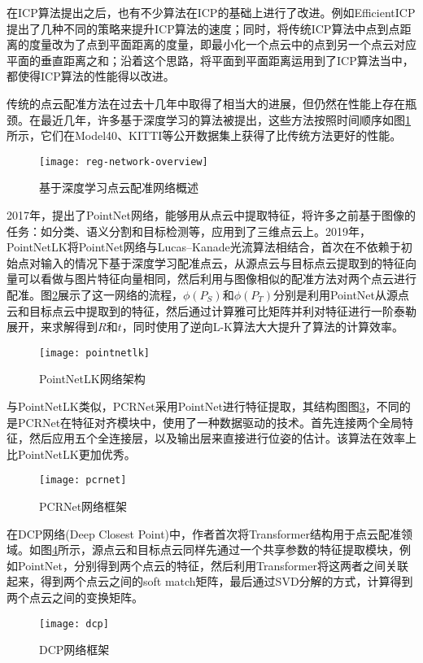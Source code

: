 在ICP算法提出之后，也有不少算法在ICP的基础上进行了改进。例如EfficientICP\cite{rusinkiewicz2001efficient}提出了几种不同的策略来提升ICP算法的速度；同时，\citet{chen1992object}将传统ICP算法中点到点距离的度量改为了点到平面距离的度量，即最小化一个点云中的点到另一个点云对应平面的垂直距离之和；沿着这个思路，\citet{forstner2017efficient}将平面到平面距离运用到了ICP算法当中，都使得ICP算法的性能得以改进。

传统的点云配准方法在过去十几年中取得了相当大的进展，但仍然在性能上存在瓶颈\cite{zhang2020deep}。在最近几年，许多基于深度学习的算法被提出，这些方法按照时间顺序如图\ref{reg-network-overview}所示，它们在Model40\cite{wu20153d}、KITTI\cite{geiger2012we}等公开数据集上获得了比传统方法更好的性能。
\begin{figure}
	\centering
	\texttt{[image: reg-network-overview]}
	\caption{基于深度学习点云配准网络概述}
	\label{reg-network-overview}
\end{figure}

2017年，\citet{qi2017pointnet}提出了PointNet网络，能够用从点云中提取特征，将许多之前基于图像的任务：如分类、语义分割和目标检测等，应用到了三维点云上。2019年，PointNetLK\cite{aoki2019pointnetlk}将PointNet网络与Lucas–Kanade光流算法\cite{baker2004lucas}相结合，首次在不依赖于初始点对输入的情况下基于深度学习配准点云，从源点云与目标点云提取到的特征向量可以看做与图片特征向量相同，然后利用与图像相似的配准方法对两个点云进行配准。图\ref{pointnetlk}展示了这一网络的流程，$\phi(P_S)$和$\phi(P_T)$分别是利用PointNet从源点云和目标点云中提取到的特征，然后通过计算雅可比矩阵并利对特征进行一阶泰勒展开，来求解得到$R$和$t$，同时使用了逆向L-K算法大大提升了算法的计算效率。
\begin{figure}
	\centering
	\texttt{[image: pointnetlk]}
	\caption{PointNetLK网络架构}
	\label{pointnetlk}
\end{figure}

与PointNetLK类似，PCRNet\cite{sarode2019pcrnet}采用PointNet进行特征提取，其结构图图\ref{pcrnet}，不同的是PCRNet在特征对齐模块中，使用了一种数据驱动的技术。首先连接两个全局特征，然后应用五个全连接层，以及输出层来直接进行位姿的估计。该算法在效率上比PointNetLK更加优秀。
\begin{figure}
	\centering
	\texttt{[image: pcrnet]}
	\caption{PCRNet网络框架}
	\label{pcrnet}
\end{figure}

在DCP网络(Deep Closest Point)\cite{wang2019deep}中，作者首次将Transformer结构\cite{vaswani2017attention}用于点云配准领域。如图\ref{dcp}所示，源点云和目标点云同样先通过一个共享参数的特征提取模块，例如PointNet，分别得到两个点云的特征，然后利用Transformer将这两者之间关联起来，得到两个点云之间的soft match矩阵，最后通过SVD分解的方式，计算得到两个点云之间的变换矩阵。
\begin{figure}
	\centering
	\texttt{[image: dcp]}
	\caption{DCP网络框架}
	\label{dcp}
\end{figure}


